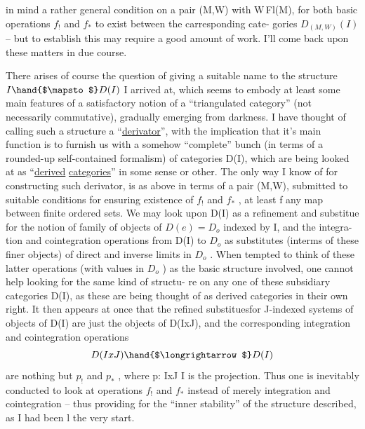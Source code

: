  in
 mind a rather general condition on a pair (M,W) with W\hand{$\subset$}\,Fl(M), for
both basic operations $f_!$ and $f_*$ to exist between the carresponding cate-%
gories $D_{(M,W)}(I)$ -- but to establish this   may require a good amount
of work. I'll come back upon these matters in due course.

There arises of course the question of giving a suitable name to the
structure $I \hand{$\mapsto$} D(I)$ I arrived at, which seems to embody at least some
main features of a satisfactory notion of a ``triangulated category'' (not
necessarily commutative), gradually emerging from darkness. I have
thought of calling such a structure a ``\uline{derivator}'', with the implication
that it's main function is to furnish us with a somehow\hand{,} ``complete'' bunch
(in terms of a rounded-up self-contained formalism) of categories D(I),
which are being looked at as ``\uline{derived} \uline{categories}'' in some sense or other.
The only way I know of for constructing such derivator, is as above in
terms of a pair (M,W), submitted to suitable conditions for ensuring
existence of $f_!$ and $f_*$ , at least  f  any map between finite ordered
sets. We may look upon D(I) as a  refinement and substitue for the
notion of family of objects of $D(e) = D_o$ indexed by I, and the integra-%
tion and cointegration operations from D(I) to $D_o$ as substitutes (interms
of these finer objects) of direct and inverse limits in $D_o$ . When tempted
to think of these latter operations (with values in $D_o$ ) as the basic
structure involved, one cannot help  looking for the same kind of structu-%
re on any one of these subsidiary categories D(I), as these are being
thought of as derived categories in their own right. It then appears at
once that the  refined substitues\hand{/}for J-indexed systems of objects of D(I)
are just the objects of D(IxJ), and the corresponding integration and
cointegration operations
\[ D(IxJ) \hand{$\longrightarrow$} D(I) \]
are nothing but $p_!$ and $p_*$ , where p: IxJ \hand{$\longrightarrow$} I is the projection. Thus
one is inevitably conducted to look at operations $f_!$ and $f_*$ instead of
merely integration and cointegration -- thus providing for the ``inner
stability'' of the structure described, as I had been l
the very start.


